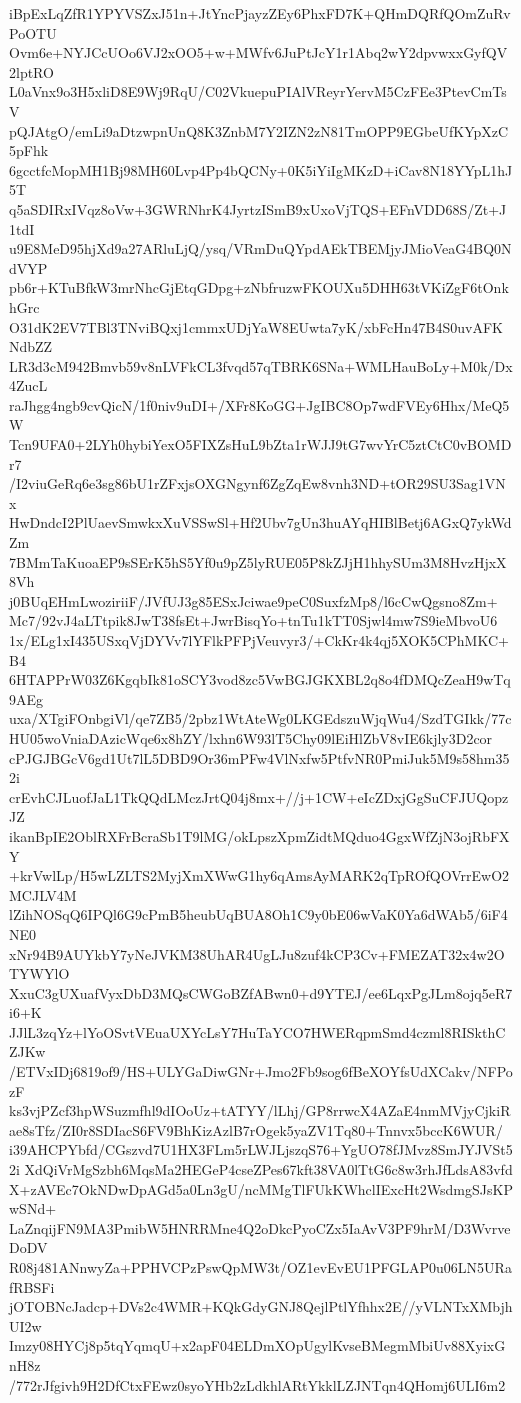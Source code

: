 iBpExLqZfR1YPYVSZxJ51n+JtYncPjayzZEy6PhxFD7K+QHmDQRfQOmZuRvPoOTU
Ovm6e+NYJCcUOo6VJ2xOO5+w+MWfv6JuPtJcY1r1Abq2wY2dpvwxxGyfQV2lptRO
L0aVnx9o3H5xliD8E9Wj9RqU/C02VkuepuPIAlVReyrYervM5CzFEe3PtevCmTsV
pQJAtgO/emLi9aDtzwpnUnQ8K3ZnbM7Y2IZN2zN81TmOPP9EGbeUfKYpXzC5pFhk
6gcctfcMopMH1Bj98MH60Lvp4Pp4bQCNy+0K5iYiIgMKzD+iCav8N18YYpL1hJ5T
q5aSDIRxIVqz8oVw+3GWRNhrK4JyrtzISmB9xUxoVjTQS+EFnVDD68S/Zt+J1tdI
u9E8MeD95hjXd9a27ARluLjQ/ysq/VRmDuQYpdAEkTBEMjyJMioVeaG4BQ0NdVYP
pb6r+KTuBfkW3mrNhcGjEtqGDpg+zNbfruzwFKOUXu5DHH63tVKiZgF6tOnkhGrc
O31dK2EV7TBl3TNviBQxj1cmmxUDjYaW8EUwta7yK/xbFcHn47B4S0uvAFKNdbZZ
LR3d3cM942Bmvb59v8nLVFkCL3fvqd57qTBRK6SNa+WMLHauBoLy+M0k/Dx4ZucL
raJhgg4ngb9cvQicN/1f0niv9uDI+/XFr8KoGG+JgIBC8Op7wdFVEy6Hhx/MeQ5W
Tcn9UFA0+2LYh0hybiYexO5FIXZsHuL9bZta1rWJJ9tG7wvYrC5ztCtC0vBOMDr7
/I2viuGeRq6e3sg86bU1rZFxjsOXGNgynf6ZgZqEw8vnh3ND+tOR29SU3Sag1VNx
HwDndcI2PlUaevSmwkxXuVSSwSl+Hf2Ubv7gUn3huAYqHIBlBetj6AGxQ7ykWdZm
7BMmTaKuoaEP9sSErK5hS5Yf0u9pZ5lyRUE05P8kZJjH1hhySUm3M8HvzHjxX8Vh
j0BUqEHmLwoziriiF/JVfUJ3g85ESxJciwae9peC0SuxfzMp8/l6cCwQgsno8Zm+
Mc7/92vJ4aLTtpik8JwT38fsEt+JwrBisqYo+tnTu1kTT0Sjwl4mw7S9ieMbvoU6
1x/ELg1xI435USxqVjDYVv7lYFlkPFPjVeuvyr3/+CkKr4k4qj5XOK5CPhMKC+B4
6HTAPPrW03Z6KgqbIk81oSCY3vod8zc5VwBGJGKXBL2q8o4fDMQcZeaH9wTq9AEg
uxa/XTgiFOnbgiVl/qe7ZB5/2pbz1WtAteWg0LKGEdszuWjqWu4/SzdTGIkk/77c
HU05woVniaDAzicWqe6x8hZY/lxhn6W93lT5Chy09lEiHlZbV8vIE6kjly3D2cor
cPJGJBGcV6gd1Ut7lL5DBD9Or36mPFw4VlNxfw5PtfvNR0PmiJuk5M9s58hm352i
crEvhCJLuofJaL1TkQQdLMczJrtQ04j8mx+//j+1CW+eIcZDxjGgSuCFJUQopzJZ
ikanBpIE2OblRXFrBcraSb1T9lMG/okLpszXpmZidtMQduo4GgxWfZjN3ojRbFXY
+krVwlLp/H5wLZLTS2MyjXmXWwG1hy6qAmsAyMARK2qTpROfQOVrrEwO2MCJLV4M
lZihNOSqQ6IPQl6G9cPmB5heubUqBUA8Oh1C9y0bE06wVaK0Ya6dWAb5/6iF4NE0
xNr94B9AUYkbY7yNeJVKM38UhAR4UgLJu8zuf4kCP3Cv+FMEZAT32x4w2OTYWYlO
XxuC3gUXuafVyxDbD3MQsCWGoBZfABwn0+d9YTEJ/ee6LqxPgJLm8ojq5eR7i6+K
JJlL3zqYz+lYoOSvtVEuaUXYcLsY7HuTaYCO7HWERqpmSmd4czml8RISkthCZJKw
/ETVxIDj6819of9/HS+ULYGaDiwGNr+Jmo2Fb9sog6fBeXOYfsUdXCakv/NFPozF
ks3vjPZcf3hpWSuzmfhl9dIOoUz+tATYY/lLhj/GP8rrwcX4AZaE4nmMVjyCjkiR
ae8sTfz/ZI0r8SDIacS6FV9BhKizAzlB7rOgek5yaZV1Tq80+Tnnvx5bccK6WUR/
i39AHCPYbfd/CGszvd7U1HX3FLm5rLWJLjszqS76+YgUO78fJMvz8SmJYJVSt52i
XdQiVrMgSzbh6MqsMa2HEGeP4cseZPes67kft38VA0lTtG6c8w3rhJfLdsA83vfd
X+zAVEc7OkNDwDpAGd5a0Ln3gU/ncMMgTlFUkKWhclIExcHt2WsdmgSJsKPwSNd+
LaZnqijFN9MA3PmibW5HNRRMne4Q2oDkcPyoCZx5IaAvV3PF9hrM/D3WvrveDoDV
R08j481ANnwyZa+PPHVCPzPswQpMW3t/OZ1evEvEU1PFGLAP0u06LN5URafRBSFi
jOTOBNcJadcp+DVs2c4WMR+KQkGdyGNJ8QejlPtlYfhhx2E//yVLNTxXMbjhUI2w
Imzy08HYCj8p5tqYqmqU+x2apF04ELDmXOpUgylKvseBMegmMbiUv88XyixGnH8z
/772rJfgivh9H2DfCtxFEwz0syoYHb2zLdkhlARtYkklLZJNTqn4QHomj6ULI6m2
